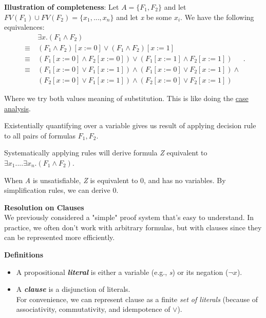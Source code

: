 \documentclass[11pt]{article}
\begin{document}
\textbf{Illustration of completeness}: Let $A = \{F_1, F_2\}$ and let $FV(F_1) \cup FV(F_2) = \{x_1, ..., x_n\}$ and let \textit{x} be some $x_i$. We have the following equivalences: 
\[
\begin{align*}
    &\exists x.(F_1 \land F_2) \\
    \equiv\ & (F_1 \land F_2)[x := 0] \lor (F_1 \land F_2)[x := 1] \\
    \equiv\ & (F_1[x := 0] \land F_2[x := 0]) \lor (F_1[x := 1] \land F_2[x := 1]) \\
    \equiv\ & (F_1[x := 0] \lor F_1[x := 1]) \land (F_1[x := 0] \lor F_2[x := 1]) \land \\
            & (F_2[x := 0] \lor F_1[x := 1]) \land (F_2[x := 0] \lor F_2[x := 1])
\end{align*}
.\] 

Where we try both values meaning of substitution. This is like doing the \underline{case analysis}. 

Existentially quantifying over a variable gives us result of applying decision rule to all pairs of formulas $F_1, F_2$. 

Systematically applying rules will derive formula \textit{Z} equivalent to $\exists x_1. ... \exists x_n. (F_1 \land F_2). $

When \textit{A} is unsatisfiable, \textit{Z} is equivalent to 0, and has no variables. By simplification rules, we can derive 0.  

\vspace{0.5cm}

\begin{center}
  {\LARGE \textbf{Resolution on Clauses}} \\
	\vspace{0.25cm}
  \small{We previously considered a "simple" proof system that's easy to understand. In practice, we often don't work with arbitrary formulas, but with clauses since they can be represented more efficiently.}
\end{center}
\vspace{0.5cm}

\begin{tcolorbox}[
    enhanced,
    frame hidden,
    borderline west={2pt}{0pt}{black},
    boxsep=5pt,
    left=8pt
]
\textbf{Definitions}
\begin{itemize}
	\item A propositional \textbf{\textit{literal}} is either a variable (e.g., \textit{s}) or its negation ($\neg x$). 
	\item A \textbf{\textit{clause}} is a disjunction of literals. \\
	For convenience, we can represent clause as a finite \textit{set of literals} (because of associativity, commutativity, and idempotence of $\lor$). 
\end{itemize}
\end{tcolorbox}
\end{document}
